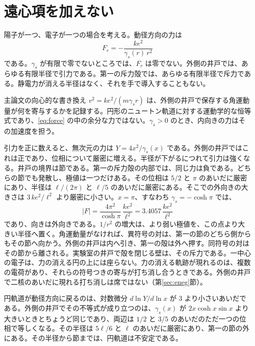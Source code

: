 \documentclass[a4paper]{article}
\begin{document}
\section{遠心項を加えない}
\label{sec:nocent}

陽子が一つ、電子が一つの場合を考える。動径方向の力は
\[
F_r=-\frac{k e^{2}}{\gamma_s(r)\,r^{2}}
\]
である。\(\gamma_s\) が有限で零でないところでは、\(F_r\) は零でない。外側の井戸では、あらゆる有限半径で引力である。第一の斥力殻では、あらゆる有限半径で斥力である。静電力が消える半径はなく、それを手で導入することもない。

主論文の向心的な書き換え \(v^{2}=k e^{2}/(m\gamma_s r)\) は、外側の井戸で保存する角運動量が何を寄与するかを記録する。円形のニュートン軌道に対する運動学的な恒等式であり、\eqref{eq:force} の中の余分な力ではない。\(\gamma_s>0\) のとき、内向きの力はその加速度を担う。

引力を正に数えると、無次元の力は \(Y=4x^{2}/\gamma_s(x)\) である。外側の井戸ではこれは正であり、位相について厳密に増える。半径が下がるにつれて引力は強くなる。井戸の境界は節である。第一の斥力殻の内部では、同じ力は負である。どちらの節でも発散し、極値は一つだけある。その位相は \(5/2\) と \(\pi\) のあいだに厳密にあり、半径は \(\ell/(2\pi)\) と \(\ell/5\) のあいだに厳密にある。そこでの外向きの大きさは \(3\,k e^{2}/\ell^{2}\) より厳密に小さい。\(x=\pi\)、すなわち \(\gamma_s=-\cosh\pi\) では、
\begin{equation}
\label{eq:plateau}
\bigl|F\bigr|
  =\frac{4\pi^{2}}{\cosh\pi}\,\frac{k e^{2}}{\ell^{2}}
  =3.4057\,\frac{k e^{2}}{\ell^{2}}
\end{equation}
であり、向きは外向きである。\(1/r^{2}\) の増大は、より弱い極値を、この点より大きい半径へ置く。角運動量がなければ、異符号の対は、第一の節のどちら側からもその節へ向かう。外側の井戸は内へ引き、第一の殻は外へ押す。同符号の対はその節から離される。実験室の井戸で殻を閉じる壁は、その斥力である。一中心の電子は、力の消える円の上には座らない。力の消える軌跡が現れるのは、複数の電荷があり、それらの符号つきの寄与が打ち消し合うときである。外側の井戸で二核のあいだに現れる打ち消しは席ではない（第\ref{sec:eneg}節）。

円軌道が動径方向に戻るのは、対数微分 \(d\ln Y/d\ln x\) が \(3\) より小さいあいだである。外側の井戸でその不等式が成り立つのは、\(\gamma_s(x)\) が \(2x\cosh x\sin x\) より大きいときとちょうど同じであり、両辺は \(1/2\) と \(3/5\) のあいだのただ一つの位相で等しくなる。その半径は \(5\ell/6\) と \(\ell\) のあいだに厳密にあり、第一の節の外にある。その半径から節までは、円軌道は不安定である。
\end{document}

